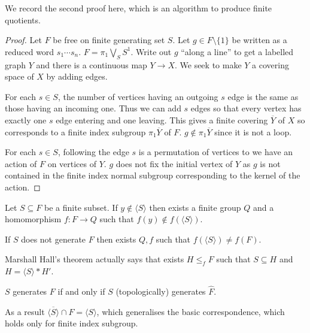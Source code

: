 \documentclass[a4paper]{article}
\begin{document}
We record the second proof here, which is an algorithm to produce finite quotients.

\begin{proof}
  Let \(F\) be free on finite generating set \(S\). Let \(g \in F \setminus \{1\}\) be written as a reduced word \(s_1 \cdots s_n\). \(F = \pi_1 \bigvee_S S^1\). Write out \(g\) ``along a line'' to get a labelled graph \(Y\) and there is a continuous map \(Y \to X\). We seek to make \(Y\) a covering space of \(X\) by adding edges.

  For each \(s \in S\), the number of vertices having an outgoing \(s\) edge is the same as those having an incoming one. Thus we can add \(s\) edges so that every vertex has exactly one \(s\) edge entering and one leaving. This gives a finite covering \(\overline Y\) of \(X\) so corresponds to a finite index subgroup \(\pi_1\overline Y\) of \(F\). \(g \notin \pi_1 \overline Y\) since it is not a loop.

  For each \(s \in S\), following the edge \(s\) is a permutation of vertices to we have an action of \(F\) on vertices of \(Y\). \(g\) does not fix the initial vertex of \(Y\) as \(g\) is not contained in the finite index normal subgroup corresponding to the kernel of the action.
\end{proof}

\begin{theorem}
  Let \(S \subseteq F\) be a finite subset. If \(y \notin \langle S\rangle\) then exists a finite group \(Q\) and a homomorphism \(f: F \to Q\) such that \(f(y) \notin f(\langle S\rangle)\).
\end{theorem}

\begin{corollary}
  If \(S\) does not generate \(F\) then exists \(Q, f\) such that \(f(\langle S\rangle) \ne f(F)\).
\end{corollary}

\begin{remark}
  Marshall Hall's theorem actually says that exists \(H \leq_f F\) such that \(S \subseteq H\) and \(H = \langle S \rangle * H'\).
\end{remark}

\begin{corollary}
  \(S\) generates \(F\) if and only if \(S\) (topologically) generates \(\hat F\).
\end{corollary}

\begin{note}
  As a result \(\overline{\langle S\rangle} \cap F = \langle S\rangle\), which generalises the basic correspondence, which holds only for finite index subgroup.
\end{note}
\end{document}
